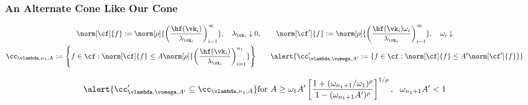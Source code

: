 \documentclass[10pt,compress,xcolor={usenames,dvipsnames},aspectratio=169]{beamer}
\begin{document}
\begin{frame}
	\frametitle{An Alternate Cone Like Our Cone}
	\vspace{-5.5ex}
	\begin{gather*}
	\norm[\cf]{f} : = \norm[\rho]{\biggl ( \frac{\hf(\vk_i) }{\lambda_{\vk_i}} \biggr) _{i=1}^\infty}, \quad \lambda_{\vk_i} \downarrow 0, \qquad
	\norm[\cf']{f} : = \norm[\rho]{\biggl ( \frac{\hf(\vk_i) \omega_i}{\lambda_{\vk_i}} \biggr) _{i=1}^\infty},  
	\quad \omega_{i} \downarrow
\\
	\cc_{\vlambda, n_1, A} : = \Biggl\{ f \in \cf : \norm[\cf]{f} \le A\norm[\rho]{\biggl ( \frac{\hf(\vk_i) }{\lambda_{\vk_i}} \biggr) _{i=1}^{n_1}} \Biggr\} 
	\qquad 
	\alert{\cc'_{\vlambda, \vomega, A'} : = \{ f \in \cf : \norm[\cf]{f} \le A'\norm[\cf']{f}\}} 
	\end{gather*}

		\begin{equation*}
\alert{\cc'_{\vlambda, \vomega, A'} \subseteq \cc_{\vlambda, n_1, A}} 
\text{for } A \ge \omega_1A'\left[\frac{1 + (\omega_{n_1+1}/\omega_1)^\rho}{1 - (\omega_{n_1+1}A')^\rho}\right]^{1/\rho}, \ \ \omega_{n_1+1}A' < 1 
		\end{equation*}

\end{frame}
\end{document}
